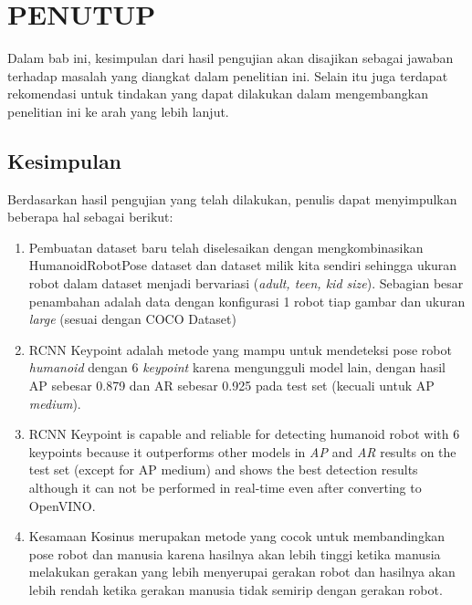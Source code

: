 \chapter{PENUTUP}
\label{chap:conclusion}

Dalam bab ini, kesimpulan dari hasil pengujian akan disajikan sebagai jawaban terhadap masalah yang diangkat dalam penelitian ini.
Selain itu juga terdapat rekomendasi untuk tindakan yang dapat dilakukan dalam mengembangkan penelitian ini ke arah yang lebih lanjut.

\section{Kesimpulan}
\label{sec:summary}

Berdasarkan hasil pengujian yang telah dilakukan, penulis dapat menyimpulkan beberapa hal sebagai berikut:

\begin{enumerate}[nolistsep]

  \item Pembuatan dataset baru telah diselesaikan dengan mengkombinasikan HumanoidRobotPose dataset dan dataset milik kita sendiri
        sehingga ukuran robot dalam dataset menjadi bervariasi (\textit{adult, teen, kid size}).
        Sebagian besar penambahan adalah data dengan konfigurasi 1 robot tiap gambar dan ukuran \textit{large} (sesuai dengan COCO Dataset)
  \item RCNN Keypoint adalah metode yang mampu untuk mendeteksi pose robot \textit{humanoid} dengan 6 \textit{keypoint} karena mengungguli model lain,
        dengan hasil AP sebesar 0.879 dan AR sebesar 0.925 pada test set (kecuali untuk AP \textit{medium}).
  \item RCNN Keypoint is capable and reliable for detecting humanoid robot with 6 keypoints because it outperforms other models in \emph{AP} and \emph{AR} results on the test set (except for AP medium)
        and shows the best detection results although it can not be performed in real-time even after converting to OpenVINO.
  \item Kesamaan Kosinus merupakan metode yang cocok untuk membandingkan pose robot dan manusia karena hasilnya akan lebih tinggi
        ketika manusia melakukan gerakan yang lebih menyerupai gerakan robot dan hasilnya akan lebih rendah ketika gerakan manusia tidak semirip dengan gerakan robot.

\end{enumerate}

